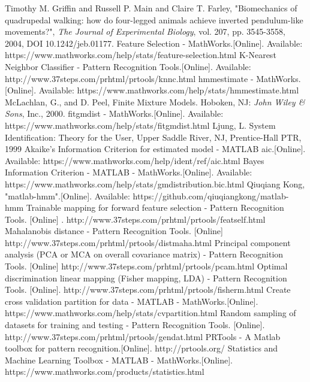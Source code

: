 \begin{thebibliography}{5}
 Timothy M. Griffin and Russell P. Main and Claire T. Farley, "Biomechanics of quadrupedal walking: how do four-legged animals achieve
inverted pendulum-like movements?", \emph{The Journal of Experimental Biology}, vol. 207, pp. 3545-3558, 2004, DOI 10.1242/jeb.01177.
 Feature Selection - MathWorks.[Online]. Available: https://www.mathworks.com/help/stats/feature-selection.html
 K-Nearest Neighbor Classifier - Pattern Recognition Tools.[Online]. Available: http://www.37steps.com/prhtml/prtools/knnc.html
 hmmestimate - MathWorks.[Online]. Available: https://www.mathworks.com/help/stats/hmmestimate.html
 McLachlan, G., and D. Peel, Finite Mixture Models. Hoboken, NJ: \emph{John Wiley \& Sons}, Inc., 2000.
 fitgmdist - MathWorks.[Online]. Available:  https://www.mathworks.com/help/stats/fitgmdist.html
 Ljung, L. System Identification: Theory for the User, Upper Saddle River, NJ, Prentice-Hall PTR, 1999
 Akaike's Information Criterion for estimated model - MATLAB aic.[Online]. Available:  https://www.mathworks.com/help/ident/ref/aic.html
 Bayes Information Criterion - MATLAB - MathWorks.[Online]. Available: https://www.mathworks.com/help/stats/gmdistribution.bic.html
 Qiuqiang Kong, "matlab-hmm".[Online]. Available: https://github.com/qiuqiangkong/matlab-hmm
 Trainable mapping for forward feature selection - Pattern Recognition Tools. [Online] . http://www.37steps.com/prhtml/prtools/featself.html
 Mahalanobis distance - Pattern Recognition Tools. [Online] http://www.37steps.com/prhtml/prtools/distmaha.html
 Principal component analysis (PCA or MCA on overall covariance matrix) - Pattern Recognition Tools. [Online] http://www.37steps.com/prhtml/prtools/pcam.html
 Optimal discrimination linear mapping (Fisher mapping, LDA) - Pattern Recognition Tools. [Online]. http://www.37steps.com/prhtml/prtools/fisherm.html
 Create cross validation partition for data - MATLAB - MathWorks.[Online]. https://www.mathworks.com/help/stats/cvpartition.html
 Random sampling of datasets for training and testing - Pattern Recognition Tools. [Online]. http://www.37steps.com/prhtml/prtools/gendat.html
 PRTools - A Matlab toolbox for pattern recognition.[Online]. http://prtools.org/
 Statistics and Machine Learning Toolbox - MATLAB - MathWorks.[Online]. https://www.mathworks.com/products/statistics.html
\end{thebibliography}